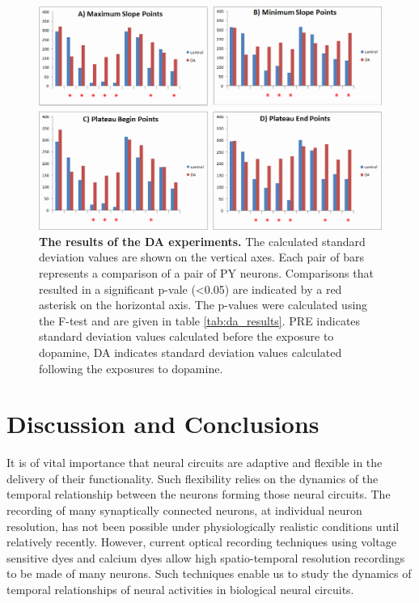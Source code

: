 \begin{figure}[H]
	\begin{center}
		\includegraphics[width=\columnwidth]{graphics/da_results.png}
		\caption[The results of the \ac{DA} experiments.]{\textbf{The results of the \ac{DA} experiments.} The calculated standard deviation values are shown on the vertical axes. Each pair of bars represents a comparison of a pair of \ac{PY} neurons. Comparisons that resulted in a significant p-vale (\textless 0.05) are indicated by a red asterisk on the horizontal axis. The p-values were calculated using the F-test and are given in table \ref{tab:da_results}. PRE indicates standard deviation values calculated before the exposure to dopamine, DA indicates standard deviation values calculated following the exposures to dopamine.}
		\label{fig:da_results}
	\end{center}
\end{figure}


\section{Discussion and Conclusions}
\label{sec:analysis_discussion}
It is of vital importance that neural circuits are adaptive and flexible in the delivery of their functionality. Such flexibility relies on the dynamics of the temporal relationship between the neurons forming those neural circuits. The recording of many synaptically connected neurons, at individual neuron resolution, has not been possible under physiologically realistic conditions until relatively recently. However, current optical recording techniques using voltage sensitive dyes and calcium dyes allow high spatio-temporal resolution recordings to be made of many neurons.  Such techniques enable us to study the dynamics of temporal relationships of neural activities in biological neural circuits.


